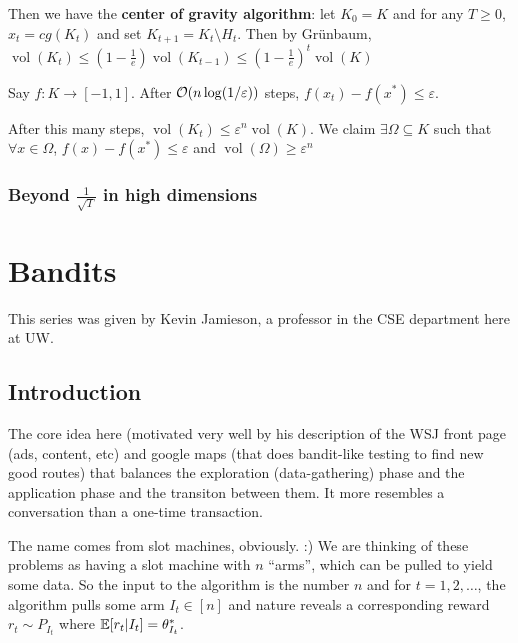 \documentclass[12pt]{article}
\begin{document}
Then we have the \textbf{center of gravity algorithm}: let $K_0=K$ and for any $T\ge 0$, $x_t=cg(K_t)$ and set $K_{t+1}=K_t\setminus H_t$. Then by Gr\"unbaum, $\operatorname{vol}(K_t)\le(1-\frac{1}{e})\operatorname{vol}(K_{t-1})\le(1-\frac{1}{e})^t\operatorname{vol}(K)$
\begin{thm}
	Say $f:K\to [-1,1]$. After $\mathcal{O}(n\log(1/\varepsilon))$ steps, $f(x_t)-f(x^\ast)\le\varepsilon$.
\end{thm}
\begin{prf}
	After this many steps, $\operatorname{vol}(K_t)\le\varepsilon^n\operatorname{vol}(K)$. We claim $\exists \Omega\subseteq K$ such that $\forall x\in\Omega$, $f(x)-f(x^\ast)\le\varepsilon$ and $\operatorname{vol}(\Omega)\ge \varepsilon^n$
\end{prf}

\subsubsection{Beyond \texorpdfstring{$\frac{1}{\sqrt{T}}$}{1/sqrt(T)} in high dimensions}






\section{Bandits}
This series was given by Kevin Jamieson, a professor in the CSE department here at UW.

\subsection{Introduction}
The core idea here (motivated very well by his description of the WSJ front page (ads, content, etc) and google maps (that does bandit-like testing to find new good routes) that balances
the exploration (data-gathering) phase and the application phase and the transiton between them. It more resembles a conversation than a one-time transaction.

The name comes from slot machines, obviously. :) We are thinking of these problems as having a slot machine with $n$ ``arms'', which can be pulled to yield some data.
So the input to the algorithm is the number $n$ and for $t=1,2,\dots$, the algorithm pulls some arm $I_t\in[n]$ and nature reveals a corresponding reward $r_t\sim P_{I_t}$ where 
$\mathbb{E}[r_t|I_t]=\theta_{I_t}^\ast$.
\end{document}
